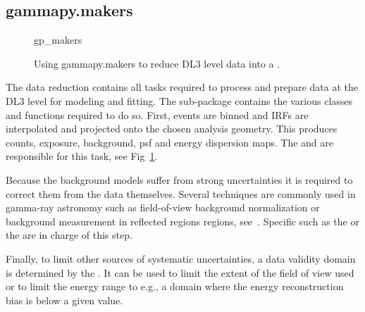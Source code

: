 \subsection{gammapy.makers}
\label{ssec:gammapy-makers}

\begin{figure}
	{gp_makers}

	\caption{Using gammapy.makers to reduce DL3 level data into a
		.}
	\label{ig*:minted:gp_makers}
\end{figure}

The data reduction contains all tasks required to process and prepare data at
the DL3 level for modeling and fitting. The  sub-package
contains the various classes and functions required to do so. First, events are
binned and IRFs are interpolated and projected onto the chosen analysis
geometry. This produces counts, exposure, background, psf and energy dispersion
maps. The  and  are
responsible for this task, see Fig~\ref{ig*:minted:gp_makers}.

Because the background models suffer from strong uncertainties it is required
to correct them from the data themselves. Several techniques are commonly used
in gamma-ray astronomy such as field-of-view background normalization or
background measurement in reflected regions regions, see~\cite{Berge07}.
Specific  such as the  or the
 are in charge of this step.

Finally, to limit other sources of systematic uncertainties, a data validity
domain is determined by the . It can be used to limit the
extent of the field of view used or to limit the energy range to e.g., a domain
where the energy reconstruction bias is below a given value.

